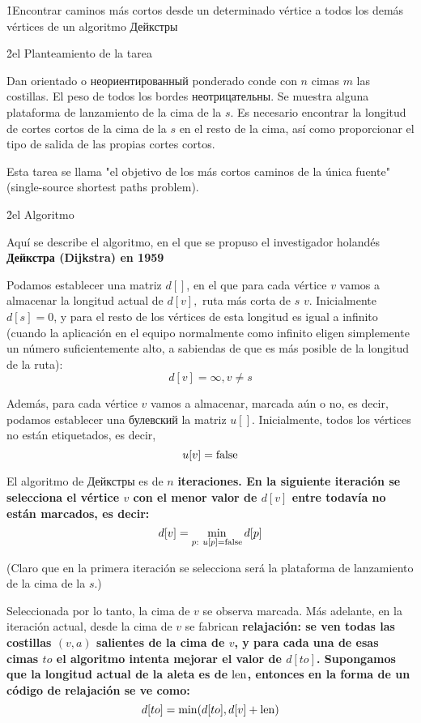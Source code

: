 \h1{Encontrar caminos más cortos desde un determinado vértice a todos los demás vértices de un algoritmo Дейкстры}

\h2{el Planteamiento de la tarea}

Dan orientado o неориентированный ponderado conde con $n$ cimas $m$ las costillas. El peso de todos los bordes неотрицательны. Se muestra alguna plataforma de lanzamiento de la cima de la $s$. Es necesario encontrar la longitud de cortes cortos de la cima de la $s$ en el resto de la cima, así como proporcionar el tipo de salida de las propias cortes cortos.

Esta tarea se llama "el objetivo de los más cortos caminos de la única fuente" (single-source shortest paths problem).

\h2{el Algoritmo}

Aquí se describe el algoritmo, en el que se propuso el investigador holandés \bf{Дейкстра} (Dijkstra) en 1959

Podamos establecer una matriz $d[]$, en el que para cada vértice $v$ vamos a almacenar la longitud actual de $d[v],$ ruta más corta de $s$ $v$. Inicialmente $d[s]=0$, y para el resto de los vértices de esta longitud es igual a infinito (cuando la aplicación en el equipo normalmente como infinito eligen simplemente un número suficientemente alto, a sabiendas de que es más posible de la longitud de la ruta):
$$ d[v] = \infty, v \ne s $$

Además, para cada vértice $v$ vamos a almacenar, marcada aún o no, es decir, podamos establecer una булевский la matriz $u[]$. Inicialmente, todos los vértices no están etiquetados, es decir,
$$ u[v] = {\rm false} $$

El algoritmo de Дейкстры es de $n$ \bf{iteraciones}. En la siguiente iteración se selecciona el vértice $v$ con el menor valor de $d[v]$ entre todavía no están marcados, es decir:
$$ d[v] = \min_{p:\ u[p]={\rm false}} d[p] $$

(Claro que en la primera iteración se selecciona será la plataforma de lanzamiento de la cima de la $s$.)

Seleccionada por lo tanto, la cima de $v$ se observa marcada. Más adelante, en la iteración actual, desde la cima de $v$ se fabrican \bf{relajación}: se ven todas las costillas $(v,a)$ salientes de la cima de $v$, y para cada una de esas cimas $to$ el algoritmo intenta mejorar el valor de $d[to]$. Supongamos que la longitud actual de la aleta es de $\rm len$, entonces en la forma de un código de relajación se ve como:
$$ d[to] = \min (d[to], d[v] + {\rm len}) $$

